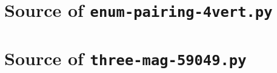 \documentclass[11pt]{article}
\theoremstyle{plain}
\theoremstyle{definition}
\begin{document}
\begin{aiblock}
\mbox{}

\end{aiblock}

\begin{aiblock}
\mbox{}

\end{aiblock}


\section{Source of \texttt{enum-pairing-4vert.py}}\label{app:code-pairing}
\mbox{}


\begin{aiblock}
\mbox{}

\end{aiblock}

\begin{aiblock}
\mbox{}

\end{aiblock}

\section{Source of \texttt{three-mag-59049.py}}\label{app:code-threemag}
\mbox{}


\begin{aiblock}
\mbox{}

\end{aiblock}

\begin{aiblock}
\mbox{}

\end{aiblock}
\end{document}

